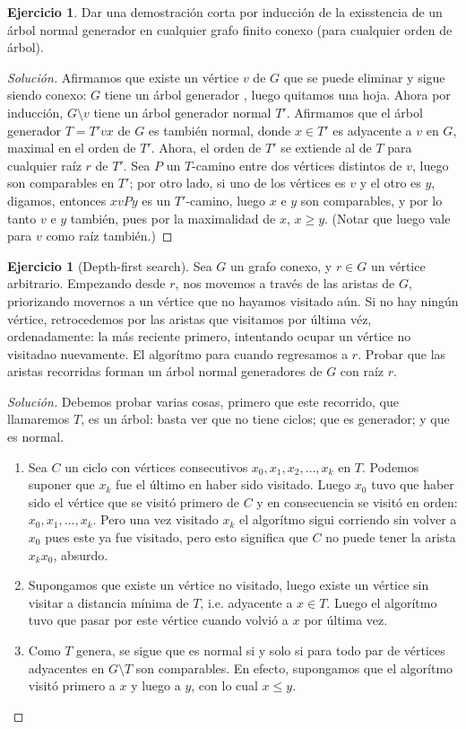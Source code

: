 \documentclass[12pt]{report}
\theoremstyle{plain}
\theoremstyle{definition}
\newtheorem{exercise}[theorem]{Ejercicio}
\newenvironment{solution}{\begin{proof}[Solución]}{\end{proof}}
\begin{document}
\begin{exercise}
Dar una demostración corta por inducción de la exisstencia de un árbol normal generador en cualquier grafo finito
conexo (para cualquier orden de árbol).
\end{exercise}
\begin{solution}
Afirmamos que existe un vértice $v$ de $G$ que se puede eliminar y sigue siendo conexo: $G$ tiene un árbol generador
, luego quitamos una hoja. Ahora por inducción, $G \setminus v$ tiene un árbol generador normal $T'$. Afirmamos
que el árbol generador $T = T' vx$ de $G$ es también normal, donde $x \in T'$ es adyacente a $v$ en $G$, maximal
en el orden de $T'$.
Ahora, el orden de $T'$ se extiende al de $T$ para cualquier raíz $r$ de $T'$. Sea $P$ un $T$-camino entre dos vértices distintos de $v$, luego son comparables en $T'$; por otro lado, si uno de los vértices es $v$ y el otro es $y$, digamos, entonces $x v P y$ es un $T'$-camino, luego $x$ e $y$ son comparables, y por lo tanto $v$ e $y$ también, pues por la maximalidad de $x$, $x \geq y$. (Notar que luego vale para $v$ como raíz también.)
\end{solution}


\begin{exercise}[Depth-first search]
Sea $G$ un grafo conexo, y $r \in G$ un vértice arbitrario. Empezando desde $r$, nos movemos a través de las aristas
de $G$, priorizando movernos a un vértice que no hayamos visitado aún. Si no hay ningún vértice, retrocedemos por las
aristas que visitamos por última véz, ordenadamente: la más reciente primero, intentando ocupar un vértice no
visitadao nuevamente. El algorítmo para cuando regresamos a $r$. Probar que las aristas recorridas forman un árbol
normal generadores de $G$ con raíz $r$.
\end{exercise}
\begin{solution}
Debemos probar varias cosas, primero que este recorrido, que llamaremos $T$, es un árbol: basta ver que no tiene
ciclos;
que
es generador; y que es
normal.
\begin{enumerate}[1.]
\item Sea $C$ un ciclo con vértices consecutivos $x_0, x_1, x_2 , \ldots, x_k$ en $T$. Podemos suponer que $x_k$ fue
el último en haber sido visitado. Luego $x_0$ tuvo que haber sido el vértice que se visitó primero de $C$ y en
consecuencia se visitó en orden: $x_0, x_1, \ldots, x_k$. Pero una vez visitado $x_k$ el algorítmo sigui corriendo
sin volver a $x_0$ pues este ya fue visitado, pero esto significa que $C$ no puede tener la arista $x_k x_0$,
absurdo.
\item Supongamos que existe un vértice no visitado, luego existe un vértice sin visitar a distancia mínima de $T$,
i.e. adyacente a $x \in T$. Luego el algorítmo tuvo que pasar por este vértice cuando volvió a $x$ por última vez.
\item Como $T$ genera, se sigue que es normal si y solo si para todo par de vértices adyacentes en $G \setminus T$ son comparables. En efecto, supongamos que el algorítmo visitó primero a $x$ y luego a $y$, con lo cual $x \leq y$.
\end{enumerate}
\end{solution}
\end{document}
